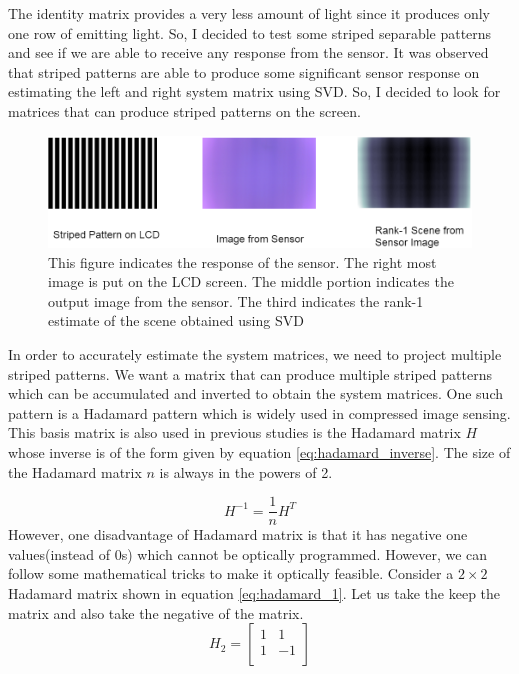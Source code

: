 The identity matrix provides a very less amount of light since it produces only one row of emitting light. So, I decided to test some striped separable patterns and see if we are able to receive any response from the sensor. It was observed that striped patterns are able to produce some significant sensor response on estimating the left and right system matrix using SVD. So, I decided to look for matrices that can produce striped patterns on the screen. 

\begin{figure}[h]
\centering
\includegraphics[width = \linewidth]{pics/Striped_Pattern_Response.png}
\caption{This figure indicates the response of the sensor. The right most image is put on the LCD screen. The middle portion indicates the output image from the sensor. The third indicates the rank-1 estimate of the scene obtained using SVD}
\label{fig:str_response}
\end{figure}

In order to accurately estimate the system matrices, we need to project multiple striped patterns. 
We want a matrix that can produce multiple striped patterns which can be accumulated and inverted to obtain the system matrices. One such pattern is a Hadamard pattern which is widely used in compressed image sensing\cite{hadamard}\cite{Flatcam}. This basis matrix is also used in previous studies is the Hadamard matrix $H$ whose inverse is of the form given by equation \ref{eq:hadamard_inverse}. The size of the Hadamard matrix $n$ is always in the powers of 2.

\begin{equation}
H^{-1} = \frac{1}{n} H^T
\label{eq:hadamard_inverse}
\end{equation}
However, one disadvantage of Hadamard matrix is that it has negative one values(instead of 0s) which cannot be optically programmed. However, we can follow some mathematical tricks to make it optically feasible. Consider a $2 \times 2$ Hadamard matrix shown in equation \ref{eq:hadamard_1}. Let us take the keep the matrix and also take the negative of the matrix.
\begin{equation}
H_2 = \begin{bmatrix} 
       1 & 1 \\
       1 & -1 \\
    \end{bmatrix}
    \label{eq:hadamard_1}
\end{equation}

